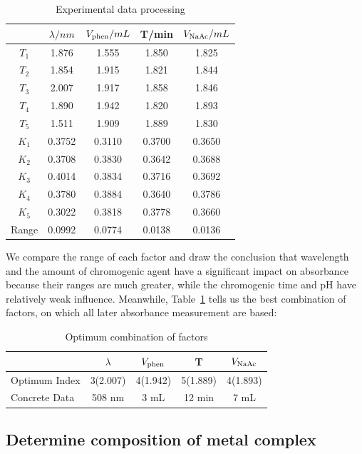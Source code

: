 \begin{table}[H]
	\caption{Experimental data processing}
	\label{Tab.OrtPro}
	\begin{tabular}{ccccc}
	\toprule
	& $\lambda /nm$ & $V_{\ce{phen}}/mL$ & T/min & $V_{\ce{NaAc}}/mL$\\
	\midrule
	$T_1$ & 1.876 & 1.555 & 1.850 & 1.825 \\
	$T_2$ & 1.854 & 1.915 & 1.821 & 1.844 \\
	$T_3$ & 2.007 & 1.917 & 1.858 & 1.846 \\
	$T_4$ & 1.890 & 1.942 & 1.820 & 1.893 \\
	$T_5$ & 1.511 & 1.909 & 1.889 & 1.830 \\
	$K_1$ & 0.3752 & 0.3110 & 0.3700 & 0.3650 \\
	$K_2$ & 0.3708 & 0.3830 & 0.3642 & 0.3688 \\
	$K_3$ & 0.4014 & 0.3834 & 0.3716 & 0.3692 \\
	$K_4$ & 0.3780 & 0.3884 & 0.3640 & 0.3786 \\
	$K_5$ & 0.3022 & 0.3818 & 0.3778 & 0.3660 \\
	Range & 0.0992 & 0.0774 & 0.0138 & 0.0136 \\
	\bottomrule
	\end{tabular}
\end{table}
We compare the range of each factor and draw the conclusion that wavelength and the amount of chromogenic agent have a significant impact on absorbance because their ranges are much greater, while the chromogenic time and pH have relatively weak influence. Meanwhile, Table~\ref{Tab.OrtPro} tells us the best combination of factors, on which all later absorbance measurement are based:

\begin{table}[H]
	\caption{Optimum combination of factors}
	\label{tab.Opt}
	\begin{tabular}{lcccc}
	\toprule
	& $\lambda$ & $V_{\ce{phen}}$ & T & $V_{\ce{NaAc}}$\\
	\midrule
	Optimum Index & 3(2.007) & 4(1.942) & 5(1.889) & 4(1.893)\\
	Concrete Data & 508 nm   & 3 mL     & 12 min   & 7 mL    \\
	\bottomrule
	\end{tabular}
\end{table}

\subsection{Determine composition of metal complex}

